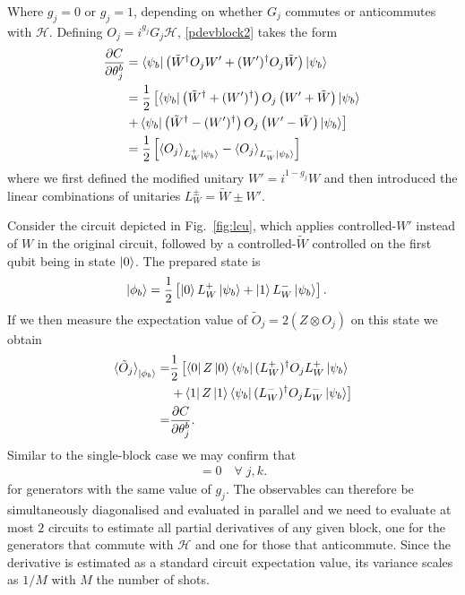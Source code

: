 \documentclass[a4paper,twocolumn,11pt]{quantumarticle}
\newcommand{\de}[1]{\left(#1\right)}
\newcommand{\De}[1]{\left[#1\right]}
\begin{document}
Where $g_j = 0$ or $g_j=1$, depending on whether $G_j$ commutes or anticommutes with $\mathcal{H}$.
Defining $O_j=i^{g_j}G_j\mathcal{H}$, \eqref{pdevblock2} takes the form 
%
\begin{align}\label{pdevblock3}
\frac{\partial C}{\partial \theta^b_j} 
&= \bra{\psi_b}\de{\tilde{W}^\dagger O_j W' + (W')^\dagger O_j\tilde{W}}\ket{\psi_b}\\
&=\frac12\left[\bra{\psi_b}\de{\tilde{W}^\dagger + (W')^\dagger} O_j \de{W'+\tilde{W}}\ket{\psi_b}\right.\nonumber\\
&\left.+\bra{\psi_b}\de{\tilde{W}^\dagger - (W')^\dagger} O_j \de{W'-\tilde{W}}\ket{\psi_b}\right]\\
&=\frac12\left[\braket{O_j}_{L_W^+\ket{\psi_b}}-\braket{O_j}_{L_W^-\ket{\psi_b}}\right]
\end{align}
where we first defined the modified unitary $W'=i^{1-g_j}W$ and then introduced the linear combinations of unitaries $L_W^\pm=\tilde{W}\pm W'$.

Consider the circuit depicted in Fig.\ \ref{fig:lcu}, which applies controlled-$W'$ instead of $W$ in the original circuit, followed by a controlled-$\tilde{W}$ controlled on the first qubit being in state $\ket{0}$. The prepared state is
\begin{align}
    \ket{\phi_b} 
    &= \frac12\De{\ket{0}L^+_W\ket{\psi_b}+\ket{1}L^-_W\ket{\psi_b}}.
\end{align}
If we then measure the expectation value of $\tilde{O}_j=2(Z\otimes O_j)$ on this state we obtain
\begin{align}
    \braket{\tilde{O}_j}_{\ket{\phi_b}}
    =& \frac12 \left[\bra{0}Z\ket{0}\bra{\psi_b}(L^+_W)^\dagger O_j L^+_W\ket{\psi_b}\right. \nonumber\\
    &\left.+\bra{1}Z\ket{1}\bra{\psi_b}(L^-_W)^\dagger O_j L^-_W\ket{\psi_b}\right]\nonumber\\
    =& \frac{\partial C}{\partial \theta^b_j}.
\end{align}
Similar to the single-block case we may confirm that
%
\begin{align}
    [O_j,O_k] = 0\quad \forall \;j,k. 
\end{align}
%
for generators with the same value of $g_j$. The observables can therefore be simultaneously diagonalised and evaluated in parallel and we need to evaluate at most $2$ circuits to estimate all partial derivatives of any given block, one for the generators that commute with $\mathcal{H}$ and one for those that anticommute. Since the derivative is estimated as a standard circuit expectation value, its variance scales as $1/M$ with $M$ the number of shots.   
\end{document}
